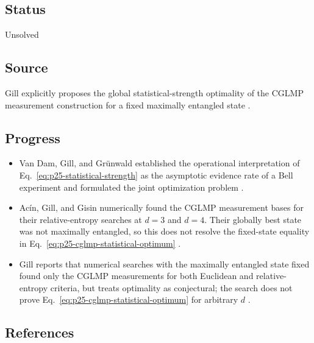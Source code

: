 \subsection*{Status}

Unsolved

\subsection*{Source}

Gill explicitly proposes the global statistical-strength optimality of the
CGLMP measurement construction for a fixed maximally entangled state
.

\subsection*{Progress}

\begin{itemize}
  \item Van Dam, Gill, and Grünwald established the operational interpretation
  of Eq.~\eqref{eq:p25-statistical-strength} as the asymptotic evidence rate of
  a Bell experiment and formulated the joint optimization problem
  .

  \item Acín, Gill, and Gisin numerically found the CGLMP measurement bases for
  their relative-entropy searches at $d=3$ and $d=4$.  Their globally best
  state was not maximally entangled, so this does not resolve the fixed-state
  equality in Eq.~\eqref{eq:p25-cglmp-statistical-optimum}
  .

  \item Gill reports that numerical searches with the maximally entangled
  state fixed found only the CGLMP measurements for both Euclidean and
  relative-entropy criteria, but treats optimality as conjectural; the search
  does not prove Eq.~\eqref{eq:p25-cglmp-statistical-optimum} for arbitrary
  $d$
  .
\end{itemize}

\subsection*{References}

